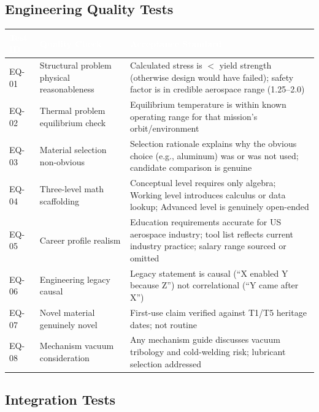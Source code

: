 \documentclass[11pt,letterpaper]{article}
\newcommand{\tableheader}[1]{\textbf{\sffamily\textcolor{white}{#1}}}
\begin{document}
\subsection{Engineering Quality Tests}

\begin{center}
\begin{tabularx}{\textwidth}{L{1.5cm}L{4cm}X}
\toprule
{}
\tableheader{Test ID} & \tableheader{Quality Check} & \tableheader{Acceptance Standard} \\
\midrule
EQ-01 & Structural problem physical reasonableness & Calculated stress is $<$ yield strength (otherwise design would have failed); safety factor is in credible aerospace range (1.25--2.0) \\
EQ-02 & Thermal problem equilibrium check & Equilibrium temperature is within known operating range for that mission's orbit/environment \\
EQ-03 & Material selection non-obvious & Selection rationale explains why the obvious choice (e.g., aluminum) was or was not used; candidate comparison is genuine \\
EQ-04 & Three-level math scaffolding & Conceptual level requires only algebra; Working level introduces calculus or data lookup; Advanced level is genuinely open-ended \\
EQ-05 & Career profile realism & Education requirements accurate for US aerospace industry; tool list reflects current industry practice; salary range sourced or omitted \\
EQ-06 & Engineering legacy causal & Legacy statement is causal (``X enabled Y because Z'') not correlational (``Y came after X'') \\
EQ-07 & Novel material genuinely novel & First-use claim verified against T1/T5 heritage dates; not routine \\
EQ-08 & Mechanism vacuum consideration & Any mechanism guide discusses vacuum tribology and cold-welding risk; lubricant selection addressed \\
\bottomrule
\end{tabularx}
\end{center}

\subsection{Integration Tests}
\end{document}
